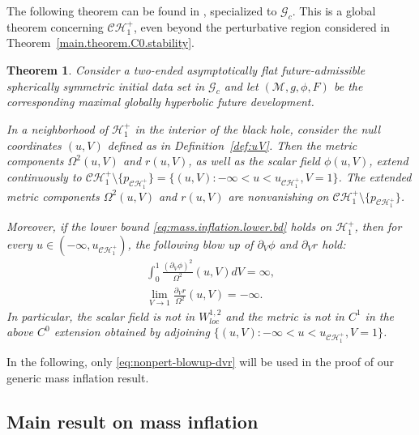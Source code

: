 \documentclass[10pt, reqno]{amsart}
\newtheorem{theorem}{Theorem}[section]
\theoremstyle{definition}
\theoremstyle{remark}
\numberwithin{equation}{section}
\newcommand{\set}[1]{\{#1\}}
\newcommand{\rd}{\partial}
\newcommand{\0}{\emptyset}
\newcommand{\Omg}{\Omega}
\newcommand{\calC}{\mathcal C}
\newcommand{\calH}{\mathcal H}
\newcommand{\calM}{\mathcal M}
\newcommand{\CH}{\calC \calH^{+}}		%
\newcommand{\EH}{\calH^{+}}
\begin{document}
The following theorem can be found in \cite[Theorem~5.5]{LO.interior}, specialized to $\mathcal G_c$. This is a global theorem concerning $\CH_1$, even beyond the perturbative region considered in Theorem~\ref{main.theorem.C0.stability}.
\begin{theorem} \label{thm.nonpert}
Consider a two-ended asymptotically flat future-admissible spherically symmetric initial data set in $\mathcal G_c$ and let $(\calM, g, \phi, F)$ be the corresponding maximal globally hyperbolic future development.  

In a neighborhood of $\EH_1$ in the interior of the black hole, consider the null coordinates $(u, V)$ defined as in Definition~\ref{def:uV}. Then the metric components $\Omg^{2}(u, V)$ and $r(u, V)$, as well as the scalar field $\phi(u, V)$, extend continuously to $\CH_{1} \setminus \set{p_{\CH_{1}}} = \set{(u, V) : -\infty < u < u_{\CH_{1}}, V = 1}$. The extended metric components $\Omg^{2}(u, V)$ and $r(u, V)$ are nonvanishing on $\CH_{1} \setminus \set{p_{\CH_{1}}}$.

Moreover, if the lower bound \eqref{eq:mass.inflation.lower.bd} holds on $\EH_{1}$, then for every $u \in (-\infty, u_{\CH_{1}})$, the following blow up of $\rd_{V} \phi$ and $\rd_{V} r$ hold:
\begin{align} 
	\int_{0}^{1} \frac{(\rd_{V} \phi)^{2}}{\Omg^{2}}(u, V) d V = \infty, \label{eq:nonpert-blowup-phi} \\
	\lim_{V \to 1} \frac{\rd_{V} r}{\Omg^{2}}(u, V) = - \infty.		\label{eq:nonpert-blowup-dvr}
\end{align}
In particular, the scalar field is not in $W^{1,2}_{loc}$ and the metric is not in $C^1$ in the above $C^0$ extension obtained by adjoining $\set{(u, V) : -\infty < u < u_{\CH_{1}}, V = 1}$.
\end{theorem}

In the following, only \eqref{eq:nonpert-blowup-dvr} will be used in the proof of our generic mass inflation result.


\subsection{Main result on mass inflation}\label{sec:main.result.mass.inflation}
\end{document}
